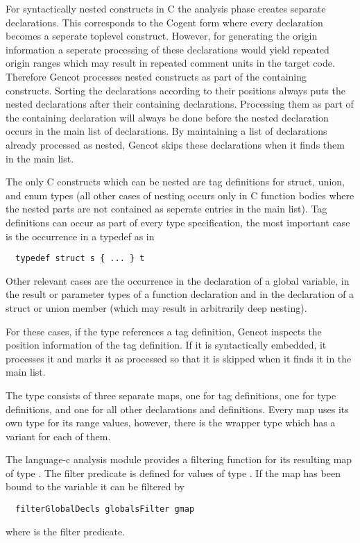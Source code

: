 For syntactically nested constructs in C the analysis phase creates separate declarations. This corresponds to the 
Cogent form where every declaration becomes a seperate toplevel construct. However, for generating the origin information 
a seperate processing of these declarations would yield repeated origin ranges which may result in repeated comment units in
the target code. Therefore Gencot processes nested 
constructs as part of the containing constructs. Sorting the declarations according to their positions always puts the
nested declarations after their containing declarations. Processing them as part of the containing declaration will
always be done before the nested declaration occurs in the main list of declarations. By maintaining a list of declarations
already processed as nested, Gencot skips these declarations when it finds them in the main list.

The only C constructs which can be nested are tag definitions for struct, union, and enum types (all other cases of nesting
occurs only in C function bodies where the nested parts are not contained as seperate entries in the main list). Tag definitions
can occur as part of every type specification, the most important case is the occurrence in a typedef as in
\begin{verbatim}
  typedef struct s { ... } t
\end{verbatim}
Other relevant cases are the occurrence in the declaration of a global variable, in the result or parameter types of a 
function declaration and in the declaration of a struct or union member (which may result in arbitrarily deep nesting).

For these cases, if the type references a tag definition, Gencot inspects the position information of the tag definition.
If it is syntactically embedded, it processes it and marks it as processed so that it is skipped when it finds it in the
main list.

The type  consists of three separate maps, one for tag definitions, one for type definitions,
and one for all other declarations and definitions. Every map uses its own type for its range values, however, 
there is the wrapper type  which has a variant for each of them. 

The language-c analysis module provides a filtering function for its resulting map of type . The filter 
predicate is defined for values of type . If the map has been bound to the variable 
it can be filtered by
\begin{verbatim}
  filterGlobalDecls globalsFilter gmap
\end{verbatim}
where  is the filter predicate.


